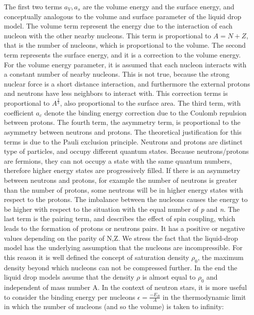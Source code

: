 The first two terms $a_{V},a_{s}$ are the volume energy and the surface energy, and conceptually analogous to the volume and surface parameter of the liquid drop model. The volume term represent the energy due to the interaction of each nucleon with the other nearby nucleons. This term is proportional to $A = N + Z$, that is the number of nucleons, which is proportional to the volume. The second term represents the surface energy, and it is a correction to the volume energy. For the volume energy parameter, it is assumed that each nucleon interacts with a constant number of nearby nucleons. This is not true, because the strong nuclear force is a short distance interaction, and furthermore the external protons and neutrons have less neighbors to interact with. This correction terms is proportional to $A^{\frac{2}{3}}$, also proportional to the surface area. 
The third term, with coefficient $a_{c}$ denote the binding energy correction due to the Coulomb repulsion between protons. The fourth term, the asymmetry term, is proportional to the asymmetry between neutrons and protons. The theoretical justification for this terms is due to the Pauli exclusion principle. Neutrons and protons are distinct type of particles, and occupy different quantum states. Because neutrons/protons are fermions, they can not occupy a state with the same quantum numbers, therefore higher energy states are progressively filled. If there is an asymmetry between neutrons and protons, for example the number of neutrons is greater than the number of protons, some neutrons will be in higher energy states with respect to the protons. The imbalance between the nucleons causes the energy to be higher with respect to the situation with the equal number of \textit{p} and \textit{n}. 
The last term is the pairing term, and describes the effect of spin coupling, which leads to the formation of protons or neutrons pairs. It has a positive or negative values depending on the parity of N,Z. 
We stress the fact that the liquid-drop model has the underlying assumption that the nucleons are incompressible. For this reason it is well defined the concept of saturation density $\rho_{0}$, the maximum density beyond which nucleons can not be compressed further. In the end the liquid drop models assume that the density $\rho$ is almost equal to $\rho_{0}$ and independent of mass number A. In the context of neutron stars, it is more useful to consider the binding energy per nucleons $\epsilon = \frac{-E_{B}}{A}$ in the thermodynamic limit in which the number of nucleons (and so the volume) is taken to infinity:

